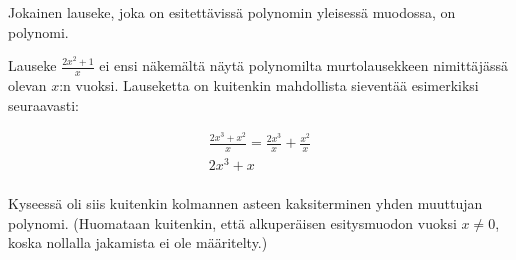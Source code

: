 Jokainen lauseke, joka on esitettävissä polynomin yleisessä muodossa, on polynomi.

\begin{esimerkki}

Lauseke $\frac{2x^2+1}{x}$ ei ensi näkemältä näytä polynomilta murtolausekkeen nimittäjässä olevan $x$:n vuoksi. Lauseketta on kuitenkin mahdollista sieventää esimerkiksi seuraavasti:

  \begin{align*}
            
            \frac{2x^3+x^2}{x}= \frac{2x^3}{x}+\frac{x^2}{x} \\
           2x^3+x\\ 
            
        \end{align*}

Kyseessä oli siis kuitenkin kolmannen asteen kaksiterminen yhden muuttujan polynomi. (Huomataan kuitenkin, että alkuperäisen esitysmuodon vuoksi $x \neq 0$, koska nollalla jakamista ei ole määritelty.)

\end{esimerkki}

